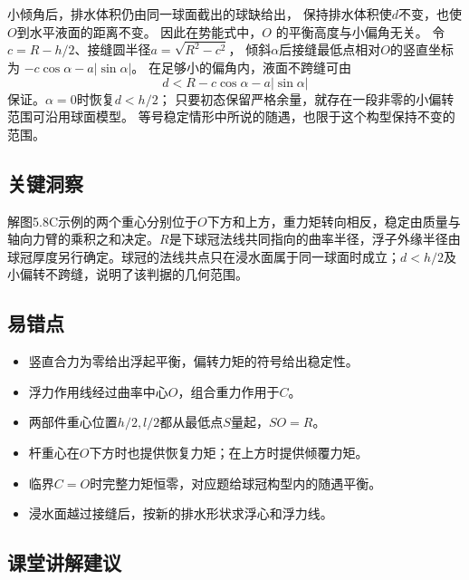 \documentclass[UTF8,fontset=fandol,a4paper,11pt]{ctexart}
\begin{document}
小倾角后，排水体积仍由同一球面截出的球缺给出，
保持排水体积使$d$不变，也使$O$到水平液面的距离不变。
因此在势能式中，$O$ 的平衡高度与小偏角无关。
令$c=R-h/2$、接缝圆半径$a=\sqrt{R^2-c^2}$，
倾斜$\alpha$后接缝最低点相对$O$的竖直坐标为
$-c\cos\alpha-a|\sin\alpha|$。
在足够小的偏角内，液面不跨缝可由
\[
d<R-c\cos\alpha-a|\sin\alpha|
\]
保证。$\alpha=0$时恢复$d<h/2$；
只要初态保留严格余量，就存在一段非零的小偏转范围可沿用球面模型。
等号稳定情形中所说的随遇，也限于这个构型保持不变的范围。




\subsection*{关键洞察}

解图5.8C示例的两个重心分别位于$O$下方和上方，重力矩转向相反，稳定由质量与轴向力臂的乘积之和决定。$R$是下球冠法线共同指向的曲率半径，浮子外缘半径由球冠厚度另行确定。球冠的法线共点只在浸水面属于同一球面时成立；$d<h/2$及小偏转不跨缝，说明了该判据的几何范围。



\subsection*{易错点}

\begin{itemize}
\item 竖直合力为零给出浮起平衡，偏转力矩的符号给出稳定性。
\item 浮力作用线经过曲率中心$O$，组合重力作用于$C$。
\item 两部件重心位置$h/2,l/2$都从最低点$S$量起，$SO=R$。
\item 杆重心在$O$下方时也提供恢复力矩；在上方时提供倾覆力矩。
\item 临界$C=O$时完整力矩恒零，对应题给球冠构型内的随遇平衡。
\item 浸水面越过接缝后，按新的排水形状求浮心和浮力线。
\end{itemize}



\subsection*{课堂讲解建议}
\end{document}
